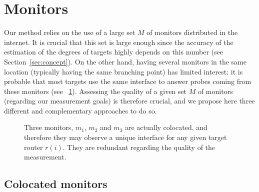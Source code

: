 \documentclass[conference]{IEEEtran}
\newcommand{\noteperso}[1]{\begin{center}
\fbox{\begin{minipage}{0.9\columnwidth}#1\end{minipage}}\end{center}}
\begin{document}


\section{Monitors} \label{sec:monitors}


Our method relies on the use of a large set $M$ of monitors distributed in the internet. It is crucial that this set is large enough since the accuracy of the estimation of the degrees of targets highly depends on this number (see Section~\ref{sec:concept}). On the other hand, having several monitors in the same location (typically having the same branching point) has limited interest: it is probable that most targets use the same interface to answer probes coming from these monitors (see \figurename~\ref{fig:colocated-monitors-observation}). Assessing the quality of a given set $M$ of monitors (regarding our measurement goals) is therefore crucial, and we propose here three different and complementary approaches to do so.

\begin{figure} \centering
\resizebox{.6\columnwidth}{!}{}
\caption{Three monitors, $m_1$, $m_2$ and $m_3$ are actually colocated, and therefore they may observe a unique interface for any given target router $r(i)$. They are redundant regarding the quality of the measurement.}
\label{fig:colocated-monitors-observation}
\end{figure}

\subsection{Colocated monitors}
\label{sec:colocated}
\end{document}
